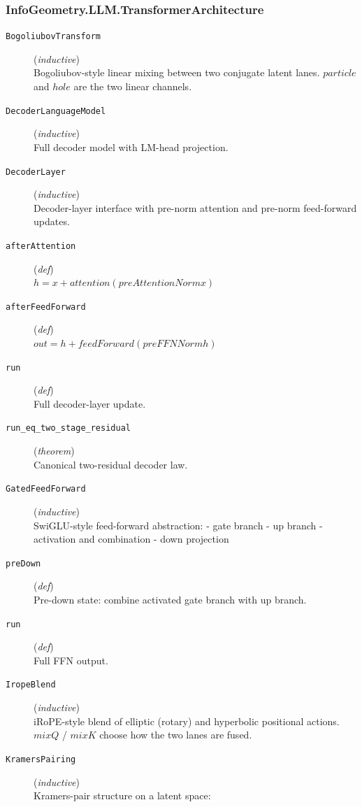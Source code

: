 \documentclass[11pt,a4paper]{article}
\begin{document}
\subsubsection*{InfoGeometry.LLM.TransformerArchitecture}
\begin{description}
  \item[\texttt{BogoliubovTransform}] (\textit{inductive}) \\ Bogoliubov-style linear mixing between two conjugate latent lanes. 
$particle$ and $hole$ are the two linear channels.
  \item[\texttt{DecoderLanguageModel}] (\textit{inductive}) \\ Full decoder model with LM-head projection.
  \item[\texttt{DecoderLayer}] (\textit{inductive}) \\ Decoder-layer interface with pre-norm attention and pre-norm feed-forward updates.
  \item[\texttt{afterAttention}] (\textit{def}) \\ $h = x + attention(preAttentionNorm x)$
  \item[\texttt{afterFeedForward}] (\textit{def}) \\ $out = h + feedForward(preFFNNorm h)$
  \item[\texttt{run}] (\textit{def}) \\ Full decoder-layer update.
  \item[\texttt{run\_eq\_two\_stage\_residual}] (\textit{theorem}) \\ Canonical two-residual decoder law.
  \item[\texttt{GatedFeedForward}] (\textit{inductive}) \\ SwiGLU-style feed-forward abstraction: 
- gate branch 
- up branch 
- activation and combination 
- down projection
  \item[\texttt{preDown}] (\textit{def}) \\ Pre-down state: combine activated gate branch with up branch.
  \item[\texttt{run}] (\textit{def}) \\ Full FFN output.
  \item[\texttt{IropeBlend}] (\textit{inductive}) \\ iRoPE-style blend of elliptic (rotary) and hyperbolic positional actions. 
$mixQ$ / $mixK$ choose how the two lanes are fused.
  \item[\texttt{KramersPairing}] (\textit{inductive}) \\ Kramers-pair structure on a latent space: 

\end{description}
\end{document}
